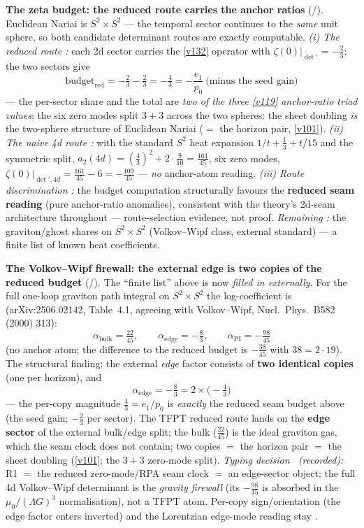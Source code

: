 \documentclass[11pt,a4paper]{article}
\begin{document}
\par\smallskip\noindent\textbf{The zeta budget: the reduced route carries the anchor ratios} (\mE/\mC).
Euclidean Nariai is $S^2\times S^2$ --- the temporal sector continues to the \emph{same} unit sphere,
so both candidate determinant routes are exactly computable. \emph{(i) The reduced route \mE:} each
2d sector carries the \vref{v132} operator with $\zeta(0)|_{\det'}=-\tfrac23$; the two sectors give
\[
  \boxed{\ \text{budget}_{\mathrm{red}}=-\tfrac23-\tfrac23=-\tfrac43=-\frac{e_1}{p_0}\ \text{(minus
  the seed gain)}\ }
\]
--- the per-sector share and the total are \emph{two of the three \vref{v119} anchor-ratio triad values};
the six zero modes split $3+3$ across the two spheres: the sheet doubling \emph{is} the two-sphere
structure of Euclidean Nariai ($=$ the horizon pair, \vref{v101}). \emph{(ii) The naive 4d route \mE:} with
the standard $S^2$ heat expansion $1/t+\tfrac13+t/15$ and the symmetric split, $a_2(4d)=
(\tfrac43)^2+2\cdot\tfrac9{10}=\tfrac{161}{45}$, six zero modes, $\zeta(0)|_{\det',4d}=
\tfrac{161}{45}-6=-\tfrac{109}{45}$ --- \emph{no} anchor-atom reading. \emph{(iii) Route
discrimination \mC:} the budget computation structurally favours the \textbf{reduced seam reading}
(pure anchor-ratio anomalies), consistent with the theory's 2d-seam architecture throughout ---
route-selection evidence, not proof. \emph{Remaining \mC:} the graviton/ghost shares on $S^2\times
S^2$ (Volkov--Wipf class, external standard) --- a finite list of known heat coefficients. 


\par\smallskip\noindent\textbf{The Volkov--Wipf firewall: the external edge is two copies of the reduced budget} (\mE/\mC).
The ``finite list'' above is now \emph{filled in externally}. For the full one-loop graviton path
integral on $S^2\times S^2$ the log-coefficient is (arXiv:2506.02142, Table~4.1, agreeing with
Volkov--Wipf, Nucl.\ Phys.\ B582 (2000) 313):
\[
  \alpha_{\mathrm{bulk}}=\tfrac{22}{45},\qquad \alpha_{\mathrm{edge}}=-\tfrac83,\qquad
  \alpha_{\mathrm{PI}}=-\tfrac{98}{45}
\]
(no anchor atom; the difference to the reduced budget is $-\tfrac{38}{45}$ with $38=2\cdot19$).
The structural finding: the external \emph{edge} factor consists of \textbf{two identical copies} (one
per horizon), and
\[
  \boxed{\ \alpha_{\mathrm{edge}}=-\tfrac83=2\times\bigl(-\tfrac43\bigr)\ }
\]
--- the per-copy magnitude $\tfrac43=e_1/p_0$ is \emph{exactly} the reduced seam budget above (the seed
gain; $-\tfrac23$ per sector). The TFPT reduced route lands on the \textbf{edge sector} of the external
bulk/edge split; the bulk ($\tfrac{22}{45}$) is the ideal graviton gas, which the seam clock does not
contain; two copies $=$ the horizon pair $=$ the sheet doubling (\vref{v101}; the $3{+}3$ zero-mode split).
\emph{Typing decision \mC\ (recorded):} R1 $=$ the reduced zero-mode/RPA seam clock $=$ an edge-sector
object; the full 4d Volkov--Wipf determinant is the \emph{gravity firewall} (its $-\tfrac{98}{45}$ is
absorbed in the $\mu_0/(\Lambda G)^3$ normalisation), not a TFPT atom. Per-copy sign/orientation (the
edge factor enters inverted) and the Lorentzian edge-mode reading stay \mC. 
\end{document}
